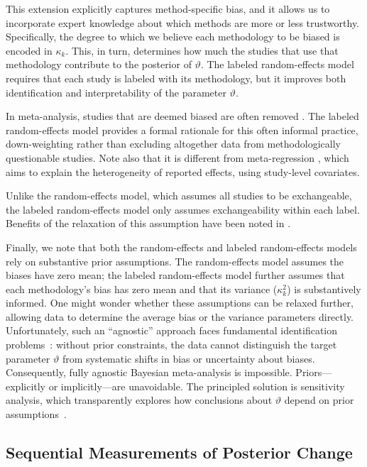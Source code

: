 This extension explicitly captures method-specific bias, and it allows us to incorporate expert knowledge about which methods are more or less trustworthy. Specifically, the degree to which we believe each methodology to be biased is encoded in $\kappa_{k}$. This, in turn, determines how much the studies that use that methodology contribute to the posterior of $\vartheta$.  The labeled random-effects model requires
that each study is labeled with its methodology, but it improves both
identification and interpretability of the parameter $\vartheta$.

In meta-analysis, studies that are deemed biased are often removed
\citep{Campbell_guidlines}. The labeled random-effects model provides a formal rationale for this often informal practice, down-weighting rather than excluding altogether data from methodologically questionable studies. Note also that it is
different from meta-regression
\citep{Thompson_Higgins_2002,Stanley_2005,stanley2012meta}, which aims
to explain the heterogeneity of reported effects, using study-level covariates.

Unlike the random-effects model, which assumes all studies to be exchangeable, the labeled random-effects model only assumes exchangeability within each label. Benefits of the relaxation of this assumption have been noted in \citep{Raudenbush_1985}.

Finally, we note that both the random-effects and labeled random-effects models rely on substantive prior assumptions. The random-effects model assumes the biases have zero mean; the labeled random-effects model further assumes that each methodology's bias has zero mean and that its variance ($\kappa_k^2$) is substantively informed. One might wonder whether these assumptions can be relaxed further, allowing data to determine the average bias or the variance parameters directly. Unfortunately, such an ``agnostic'' approach faces fundamental identification problems~\citep{gustafson2015bayesian,Gerber_Green_Kaplan_2004}: without prior constraints, the data cannot distinguish the target parameter $\vartheta$ from systematic shifts in bias or uncertainty about biases. Consequently, fully agnostic Bayesian meta-analysis is impossible. Priors---explicitly or implicitly---are unavoidable. The principled solution is sensitivity analysis, which transparently explores how conclusions about $\vartheta$ depend on prior assumptions~\citep{Li_Ding_Mealli_2022,Mikhaeil_2025}.


\subsection{Sequential Measurements of Posterior Change}
\label{Sec:LearningMetric}

